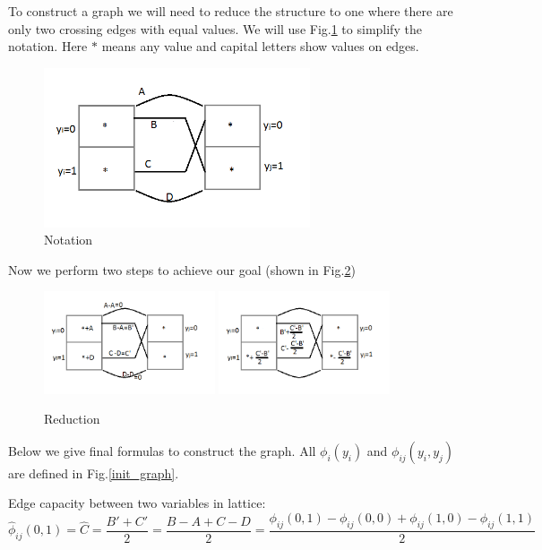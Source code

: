 \documentclass[paper=a4, fontsize=11pt]{scrartcl} %
\numberwithin{equation}{section} %
\numberwithin{figure}{section} %
\numberwithin{table}{section} %
\begin{document}
To construct a graph we will need to reduce the structure to one where there are only two crossing edges with equal values.
We will use Fig.\ref{graph1} to simplify the notation. Here $*$ means any value and capital letters show values on edges.
\begin{figure}[h!]
\begin{center}
\includegraphics[width=0.7\textwidth]{graph3.png}
\end{center}
\caption{Notation}
\label{graph1}
\end{figure}

Now we perform two steps to achieve our goal (shown in Fig.\ref{graph2})
\begin{figure}[h!]
\begin{center}
\includegraphics[width=0.45\textwidth]{graph4.png}
\includegraphics[width=0.45\textwidth]{graph5.png}
\end{center}
\caption{Reduction}
\label{graph2}
\end{figure}

Below we give final formulas to construct the graph. All $\phi_i(y_i)$ and $\phi_{ij}(y_i, y_j)$ are defined in Fig.\ref{init_graph}.

Edge capacity between two variables in lattice:
$$\hat{\phi}_{ij}(0, 1) = \hat{C} = \dfrac{B' + C'}{2} = \dfrac{B-A+C-D}{2} = 
\dfrac{\phi_{ij}(0, 1) - \phi_{ij}(0, 0) + \phi_{ij}(1, 0) - \phi_{ij}(1, 1)}{2}$$
\end{document}
